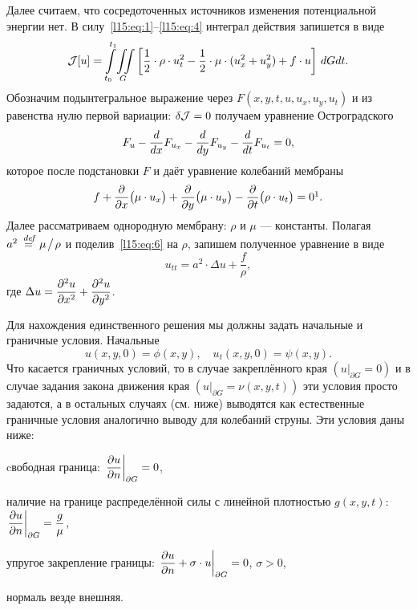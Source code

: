 Далее считаем, что сосредоточенных источников изменения потенциальной энергии нет. В силу~\eqref{l15:eq:1}--\eqref{l15:eq:4} интеграл действия запишется в виде
\begin{equation*}
	\mathcal{J}[u]=\int\limits_{t_0}^{t_1}\!\iint\limits_{G}\left[\frac{1}{2}\cdot\rho\cdot u_t^2-\frac{1}{2}\cdot\mu\cdot(u_x^2+u_y^2)+f\cdot u\right]\,dGdt.
\end{equation*}
Обозначим подынтегральное выражение через $F(x,y,t,u,u_x,u_y,u_t)$ и из равенства нулю первой вариации: $\delta\mathcal{J}=0$ получаем уравнение Остроградского
\begin{equation*}
	 F_u-\frac{d}{dx}F_{u_x}-\frac{d}{dy}F_{u_y}-\frac{d}{dt}F_{u_t}=0,
\end{equation*}
которое после подстановки $F$ и даёт уравнение колебаний мембраны
\begin{equation}\label{l15:eq:6}
	 f+\pder{}{x}\big(\mu\cdot u_x\big)+\pder{}{y}\big(\mu\cdot u_y\big)-\pder{}{t}\big(\rho\cdot u_t\big)=0\footnotemark{}.
\end{equation}%
Далее рассматриваем однородную мембрану: $\rho$ и $\mu$ --- константы. Полагая $a^2\stackrel{\hspace{0.09 cm}de\!f}{=}\mu\!\bigm/\!\rho$ и поделив~\eqref{l15:eq:6} на $\rho$, запишем полученное уравнение в виде
\begin{equation}\label{l15:eq:7}
	 u_{tt}=a^2\cdot\Delta u+\frac{f}{\rho},
\end{equation}
где $\displaystyle\Delta u=\frac{\partial^2u}{\partial x^2}+\frac{\partial^2u}{\partial y^2}$.

Для нахождения единственного решения мы должны задать начальные и граничные условия. Начальные
\begin{equation}\label{l15:eq:8}
	 u(x,y,0)=\phi(x,y),\quad u_t(x,y,0)=\psi(x,y).
\end{equation}
Что касается граничных условий, то в случае закреплённого края $\left(u\Big|_{\partial G}=0\right)$ и в случае задания закона движения края $\left(u\Big|_{\partial G}=\nu(x,y,t)\right)$ эти условия просто задаются, а в остальных случаях (см. ниже) выводятся как естественные граничные условия аналогично выводу для колебаний струны. Эти условия даны ниже:
\begin{enumerateD}
	\item cвободная граница: $\displaystyle \left.\frac{\partial u}{\partial n}\right|_{\partial G}=0$,
	\item наличие на границе распределённой силы с линейной плотностью $g(x,y,t)$: $\displaystyle \left.\frac{\partial u}{\partial n}\right|_{\partial G}=\frac{g}{\mu}$,
	\item упругое закрепление границы: $\displaystyle\left.\frac{\partial u}{\partial n}+\sigma\cdot u\right|_{\partial G}=0$, $\sigma>0$, 
\end{enumerateD}
нормаль везде внешняя.

